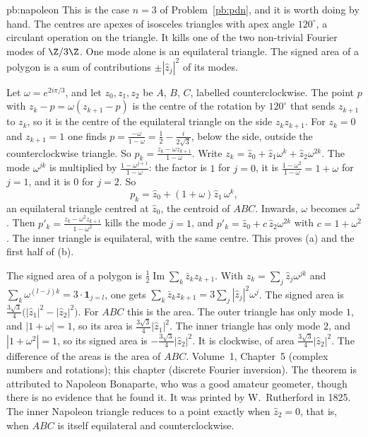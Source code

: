 \begin{solution}{pb:napoleon}
\idea This is the case $n=3$ of Problem~\ref{pb:pdn}, and it is worth doing by hand. The centres are apexes of isosceles triangles with apex angle $120^\circ$, a circulant operation on the triangle. It kills one of the two non-trivial Fourier modes of $\Z/3\Z$. One mode alone is an equilateral triangle. The signed area of a polygon is a sum of contributions $\pm|\hat z_j|^2$ of its modes.

\writeup Let $\omega=e^{2i\pi/3}$, and let $z_0,z_1,z_2$ be $A$, $B$, $C$, labelled counterclockwise. The point $p$ with $z_k-p=\omega(z_{k+1}-p)$ is the centre of the rotation by $120^\circ$ that sends $z_{k+1}$ to $z_k$, so it is the centre of the equilateral triangle on the side $z_kz_{k+1}$. For $z_k=0$ and $z_{k+1}=1$ one finds $p=\frac{-\omega}{1-\omega}=\frac12-\frac i{2\sqrt3}$, below the side, outside the counterclockwise triangle. So $p_k=\frac{z_k-\omega z_{k+1}}{1-\omega}$. Write $z_k=\hat z_0+\hat z_1\omega^k+\hat z_2\omega^{2k}$. The mode $\omega^{jk}$ is multiplied by $\frac{1-\omega^{j+1}}{1-\omega}$: the factor is $1$ for $j=0$, it is $\frac{1-\omega^2}{1-\omega}=1+\omega$ for $j=1$, and it is $0$ for $j=2$. So
\[
p_k=\hat z_0+(1+\omega)\hat z_1\,\omega^k,
\]
an equilateral triangle centred at $\hat z_0$, the centroid of $ABC$. Inwards, $\omega$ becomes $\omega^2$. Then $p'_k=\frac{z_k-\omega^2 z_{k+1}}{1-\omega^2}$ kills the mode $j=1$, and $p'_k=\hat z_0+c\,\hat z_2\omega^{2k}$ with $c=1+\omega^2$. The inner triangle is equilateral, with the same centre. This proves (a) and the first half of (b).

The signed area of a polygon is $\frac12\operatorname{Im}\sum_k\bar z_k z_{k+1}$. With $z_k=\sum_j\hat z_j\omega^{jk}$ and $\sum_k\omega^{(l-j)k}=3\cdot\mathbf 1_{j=l}$, one gets $\sum_k\bar z_k z_{k+1}=3\sum_j|\hat z_j|^2\omega^j$. The signed area is $\frac{3\sqrt3}4\bigl(|\hat z_1|^2-|\hat z_2|^2\bigr)$. For $ABC$ this is the area. The outer triangle has only mode $1$, and $|1+\omega|=1$, so its area is $\frac{3\sqrt3}4|\hat z_1|^2$. The inner triangle has only mode $2$, and $|1+\omega^2|=1$, so its signed area is $-\frac{3\sqrt3}4|\hat z_2|^2$. It is clockwise, of area $\frac{3\sqrt3}4|\hat z_2|^2$. The difference of the areas is the area of $ABC$.
\tools Volume~1, Chapter~5 (complex numbers and rotations); this chapter (discrete Fourier inversion).
\leads The theorem is attributed to Napoleon Bonaparte, who was a good amateur geometer, though there is no evidence that he found it. It was printed by W.~Rutherford in 1825. The inner Napoleon triangle reduces to a point exactly when $\hat z_2=0$, that is, when $ABC$ is itself equilateral and counterclockwise.
\end{solution}

